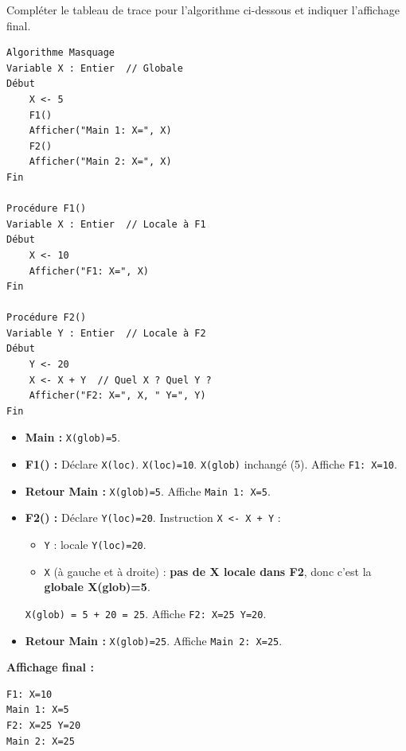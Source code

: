 \documentclass[11pt]{article}
\begin{document}
\begin{exercice}
Compléter le tableau de trace pour l'algorithme ci-dessous et indiquer l'affichage final.
\begin{lstlisting}
Algorithme Masquage
Variable X : Entier  // Globale
Début
    X <- 5
    F1()
    Afficher("Main 1: X=", X)
    F2()
    Afficher("Main 2: X=", X)
Fin

Procédure F1()
Variable X : Entier  // Locale à F1
Début
    X <- 10
    Afficher("F1: X=", X)
Fin

Procédure F2()
Variable Y : Entier  // Locale à F2
Début
    Y <- 20
    X <- X + Y  // Quel X ? Quel Y ?
    Afficher("F2: X=", X, " Y=", Y)
Fin
\end{lstlisting}
\end{exercice}

\begin{corrige}[Exercice n°2]
\begin{itemize}
    \item \textbf{Main :} \texttt{X(glob)=5}.
    \item \textbf{F1() :} Déclare \texttt{X(loc)}. \texttt{X(loc)=10}. \texttt{X(glob)} inchangé (5). Affiche \texttt{F1: X=10}.
    \item \textbf{Retour Main :} \texttt{X(glob)=5}. Affiche \texttt{Main 1: X=5}.
    \item \textbf{F2() :} Déclare \texttt{Y(loc)=20}. Instruction \texttt{X <- X + Y} :
        \begin{itemize}
            \item \texttt{Y} : locale \texttt{Y(loc)=20}.
            \item \texttt{X} (à gauche et à droite) : \textbf{pas de X locale dans F2}, donc c'est la \textbf{globale X(glob)=5}.
        \end{itemize}
        \texttt{X(glob) = 5 + 20 = 25}. Affiche \texttt{F2: X=25 Y=20}.
    \item \textbf{Retour Main :} \texttt{X(glob)=25}. Affiche \texttt{Main 2: X=25}.
\end{itemize}
\textbf{Affichage final :}
\begin{verbatim}
F1: X=10
Main 1: X=5
F2: X=25 Y=20
Main 2: X=25
\end{verbatim}
\end{corrige}
\end{document}
